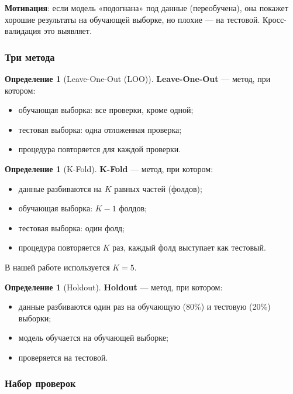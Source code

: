 \documentclass[11pt,a4paper]{article}
\theoremstyle{definition}
\newtheorem{definition}[theorem]{Определение}
\begin{document}
\medskip\noindent
\textbf{Мотивация}: если модель «подогнана» под данные
(переобучена), она покажет хорошие результаты на обучающей
выборке, но плохие --- на тестовой. Кросс-валидация это выявляет.

\subsubsection{Три метода}

\begin{definition}[Leave-One-Out (LOO)]
\label{def:loo}
\textbf{Leave-One-Out} --- метод, при котором:
\begin{itemize}
    \item обучающая выборка: все проверки, кроме одной;
    \item тестовая выборка: одна отложенная проверка;
    \item процедура повторяется для каждой проверки.
\end{itemize}
\end{definition}

\begin{definition}[K-Fold]
\label{def:kfold}
\textbf{K-Fold} --- метод, при котором:
\begin{itemize}
    \item данные разбиваются на $K$ равных частей (фолдов);
    \item обучающая выборка: $K-1$ фолдов;
    \item тестовая выборка: один фолд;
    \item процедура повторяется $K$ раз, каждый фолд выступает
          как тестовый.
\end{itemize}
В нашей работе используется $K = 5$.
\end{definition}

\begin{definition}[Holdout]
\label{def:holdout}
\textbf{Holdout} --- метод, при котором:
\begin{itemize}
    \item данные разбиваются один раз на обучающую (80\%)
          и тестовую (20\%) выборки;
    \item модель обучается на обучающей выборке;
    \item проверяется на тестовой.
\end{itemize}
\end{definition}

\subsubsection{Набор проверок}
\end{document}
